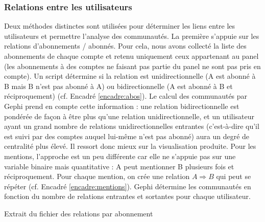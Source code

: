 \subsubsection{Relations entre les utilisateurs}
Deux méthodes distinctes sont utilisées pour déterminer les liens entre les utilisateurs et permettre l’analyse des communautés. La première s’appuie sur les relations d’abonnements / abonnés. Pour cela, nous avons collecté la liste des abonnements de chaque compte et retenu uniquement ceux appartenant au panel (les abonnements à des comptes ne faisant pas partie du panel ne sont pas pris en compte). Un script détermine si la relation est unidirectionnelle (A est abonné à B mais B n’est pas abonné à A) ou bidirectionnelle (A est abonné à B et réciproquement) (cf. Encadré \ref{encadre:abos}). Le calcul des communautés par Gephi prend en compte cette information : une relation bidirectionnelle est pondérée de façon à être plus  qu’une  relation unidirectionnelle, et un utilisateur ayant un grand nombre de relations unidirectionnelles entrantes (c'est-à-dire qu’il est suivi par des comptes auquel lui-même n’est pas abonné) aura un degré de centralité plus élevé. Il ressort donc mieux sur la visualisation produite. Pour les mentions, l’approche est un peu différente car elle ne s’appuie pas sur une variable binaire mais quantitative : A peut mentionner B plusieurs fois et réciproquement. Pour chaque mention, on crée une relation $A\Rightarrow B$ qui peut se répéter (cf. Encadré \ref{encadre:mentions}). Gephi détermine les communautés en fonction du nombre de relations entrantes et sortantes pour chaque utilisateur.

\begin{encadre}
    \caption{Extrait du fichier des relations par abonnement}
    \label{encadre:abos}
    \noindent{}
\end{encadre}

